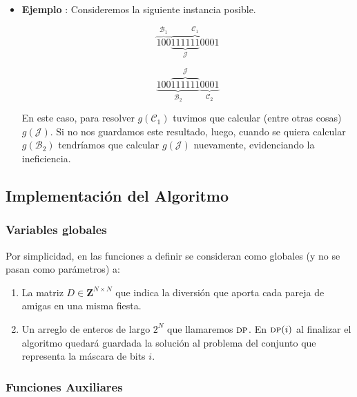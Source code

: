 \begin{itemize}
	\item \textbf{Ejemplo} : Consideremos la siguiente instancia posible.
	
	 $$\overset{\mathcal{B}_1}{\overbrace{100}} \overset{\mathcal{C}_1}{\overbrace{\underset{\mathcal{J}}{\underbrace{111111}}0001}}$$
	
	$$\underset{\mathcal{B}_2}{\underbrace{100\overset{\mathcal{J}}{\overbrace{111111}}}}\underset{\mathcal{C}_2}{\underbrace{0001}}$$
	
	En este caso, para resolver $g(\mathcal{C}_1)$ tuvimos que calcular (entre otras cosas) $g(\mathcal{J})$. Si no nos guardamos este resultado, luego, cuando se quiera calcular $g(\mathcal{B}_2)$ tendríamos que calcular $g(\mathcal{J})$ nuevamente, evidenciando la ineficiencia.
\end{itemize} 

\subsection*{Implementación del Algoritmo}

\subsubsection*{Variables globales}

Por simplicidad, en las funciones a definir se consideran como globales (y no se pasan como parámetros) a:

\begin{enumerate}

	\item La matriz $D \in \mathbf{Z}^{N \times N}$ que indica la diversión que aporta cada pareja de amigas en una misma fiesta.
	\item Un arreglo de enteros de largo $2^N$ que llamaremos $\textsc{dp}$. En $\textsc{dp}(i)$ al finalizar el algoritmo quedará guardada la solución al problema del conjunto que representa la máscara de bits $i$.
\end{enumerate}  

\subsubsection*{Funciones Auxiliares}

